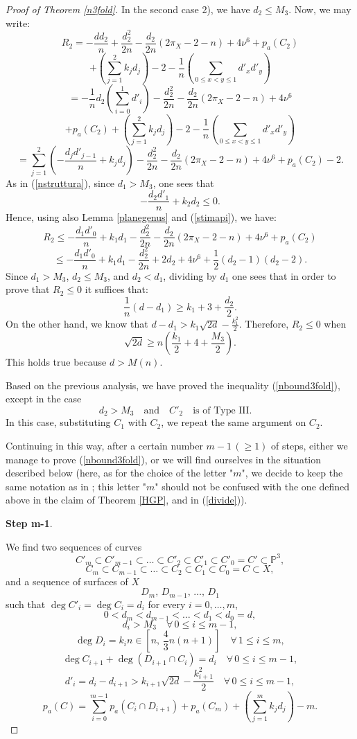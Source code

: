 \documentclass[9pt,a4paper]{amsart}
\theoremstyle{plain}
\theoremstyle{definition}
\theoremstyle{remark}
\begin{document}
\begin{proof}[Proof of Theorem \ref{n3fold}]
\smallskip
In the second case 2), we have $d_2\leq M_3$. Now, we may write:
$$
R_2=-\frac{dd_2}{n}+\frac{d_2^2}{2n}-\frac{d_2}{2n}(2\pi_X-2-n)+4\nu^6+p_a(C_2)
$$
$$
+\left(\sum_{j=1}^{2}k_jd_j\right)-2-\frac{1}{n}\left(\sum_{0\leq
x<y\leq 1}d'_xd'_y\right)
$$
$$
=-\frac{1}{n}d_2\left(\sum_{i=0}^{1}d'_i\right)-\frac{d_2^2}{2n}-\frac{d_2}{2n}(2\pi_X-2-n)+4\nu^6
$$
$$
+p_a(C_2)+\left(\sum_{j=1}^{2}k_jd_j\right)-2-\frac{1}{n}\left(\sum_{0\leq
x<y\leq 1}d'_xd'_y\right)
$$
$$
=\sum_{j=1}^{2}\left(-\frac{d_jd'_{j-1}}{n}+k_jd_j\right)
-\frac{d_2^2}{2n}-\frac{d_2}{2n}(2\pi_X-2-n)+4\nu^6 +p_a(C_2)-2.
$$
As in (\ref{nstruttura}), since $d_1>M_3$, one sees that
$$
-\frac{d_2d'_{1}}{n}+k_2d_2\leq 0.
$$
Hence, using also Lemma \ref{planegenus} and (\ref{stimapi}), we have:
$$
R_2\leq
-\frac{d_1d'_{0}}{n}+k_1d_1-\frac{d_2^2}{2n}-\frac{d_2}{2n}(2\pi_X-2-n)+4\nu^6
+p_a(C_2)
$$
$$
\leq
-\frac{d_1d'_{0}}{n}+k_1d_1-\frac{d_2^2}{2n}+2{d_2}+4\nu^6+\frac{1}{2}(d_2-1)(d_2-2).
$$
Since $d_1>M_3$, $d_2\leq M_3$, and $d_2<d_1$, dividing by $d_1$ one sees that in
order to prove that $R_2\leq 0$ it suffices that:
$$
\frac{1}{n}(d-d_1)\geq k_1+3+\frac{d_2}{2}.
$$
On the other hand, we know that $d-d_1>
k_1\sqrt{2d}-\frac{k_1^2}{2}$. Therefore,  $R_2\leq 0$ when
$$
\sqrt{2d}\geq n\left(\frac{k_1}{2}+4+\frac{M_3}{2}\right).
$$
This holds true because $d>M(n)$.


\smallskip
Based on the previous analysis, we have proved the inequality
(\ref{nbound3fold}), except in the case
$$
d_2>M_3\quad{\text{and}}\quad C'_2\quad{\text{is of Type III.}}\quad
$$
In this case, substituting $C_1$ with $C_2$, we repeat the same
argument on $C_2$.

\smallskip
Continuing in this way, after a certain number $m-1\,(\geq 1)$ of
steps, either we manage to prove (\ref{nbound3fold}), or we will find
ourselves in the situation described below (here, as for the choice of the letter "$m$",
we decide to keep the same notation as in \cite[p. 23]{Liu}; this letter  "$m$" should not be confused with the one defined above
in the claim of Theorem \ref{HGP}, and in (\ref{divide})).

\smallskip
{\bf{Step m-1}}.

\smallskip
We find two sequences of curves
$$C'_m\subset C'_{m-1}\subset \dots\subset C'_2\subset C'_1\subset C'_0=C'\subset \mathbb P^3,$$
$$C_m\subset C_{m-1}\subset \dots\subset C_2\subset C_1\subset C_0=C\subset X,$$
and a sequence of surfaces of $X$
$$
D_m, \, D_{m-1},\,\dots,\,D_1
$$
such that $\deg C'_i=\deg C_i=d_i$ for every $i=0,\dots,m$,
\begin{equation}\label{degrees}
0<d_m<d_{m-1}<\dots < d_1<d_0=d,
\end{equation}
$$
d_i>M_3\quad \forall \, 0\leq i\leq m-1,
$$
$$
\deg D_i=k_in\in [n,\,\frac{4}{3}n(n+1)]\quad \forall \, 1\leq i\leq
m,
$$
$$
\deg C_{i+1}+\deg(D_{i+1}\cap C_i)=d_i \quad\forall \, 0\leq i\leq
m-1,
$$
$$
d'_i=d_i-d_{i+1}> k_{i+1}\sqrt{2d}-\frac{k_{i+1}^2}{2}\quad \forall
\, 0\leq i\leq m-1,
$$
\begin{equation}\label{stimaC_m}
p_a(C)=\sum_{i=0}^{m-1}p_a(C_i\cap
D_{i+1})+p_a(C_m)+\left(\sum_{j=1}^{m}k_jd_j\right)-m.
\end{equation}



\end{proof}
\end{document}

